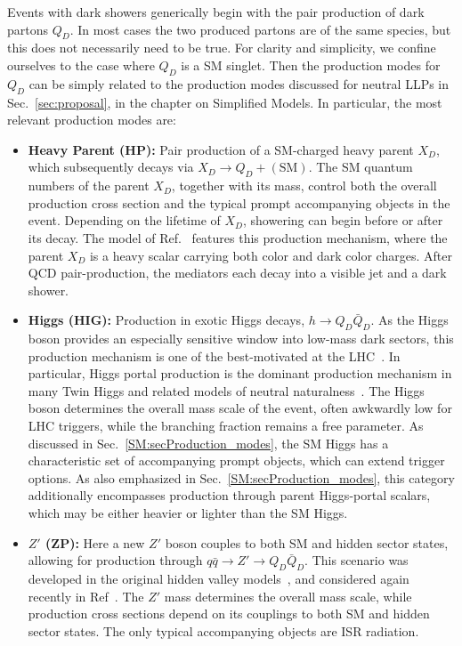 Events with dark showers generically begin with the pair production of dark partons $Q_D$. In most cases the two produced partons are of the same species, but this does not necessarily need to be true. For clarity and simplicity, we  confine ourselves to the case where $Q_D$ is a SM singlet. Then the production modes for $Q_D$ can be simply related to the production modes discussed for neutral LLPs in Sec.~\ref{sec:proposal}, in the chapter on Simplified Models. In particular, the most relevant production modes are:
%
\begin{itemize}

\item {\bf Heavy Parent (HP):} Pair production of a SM-charged heavy parent $X_D$, which subsequently decays via $X_D\to Q_D+\mathrm{(SM)}$. The SM quantum numbers of the parent $X_D$, together with its mass, control both the overall production cross section and the typical prompt accompanying objects in the event. Depending on the lifetime of $X_D$, showering can begin before or after its decay. The model of Ref.~\cite{Schwaller:2015gea} features this production mechanism, where the parent $X_D$ is a heavy scalar carrying both color and dark color charges. After QCD pair-production, the mediators each decay into a visible jet and a dark shower.

\item {\bf Higgs (HIG):} Production in exotic Higgs decays, $h\to Q_D\bar Q_D$. As the Higgs boson provides an especially sensitive window into low-mass dark sectors, this production mechanism is one of the best-motivated at the LHC~\cite{Strassler:2006ri,Curtin:2013fra}. In particular, Higgs portal production is the dominant production mechanism in many Twin Higgs and related models of neutral naturalness~\cite{Craig:2015pha,Craig:2016kue,Curtin:2015fna}. The Higgs boson determines the overall mass scale of the event, often awkwardly low for LHC triggers, while the branching fraction remains a free parameter. As discussed in Sec.~\ref{SM:secProduction_modes}, the SM Higgs has a characteristic set of accompanying prompt objects, which can extend trigger options. As also emphasized in Sec.~\ref{SM:secProduction_modes}, this category additionally encompasses production through parent Higgs-portal scalars, which may be either heavier or lighter than the SM Higgs.

\item {\bf $Z'$ (ZP):} Here a new $Z'$ boson couples to both SM and hidden sector states, allowing for production through $q\bar q \to Z'\to Q_D\bar Q_D$. This scenario was developed in the original hidden valley models~\cite{Strassler:2006im,Han:2007ae}, and considered again recently in Ref~\cite{Cohen:2015toa}. The $Z'$ mass determines the overall mass scale, while production cross sections depend on its couplings to both SM and hidden sector states. The only typical accompanying objects are ISR radiation.


\end{itemize}
